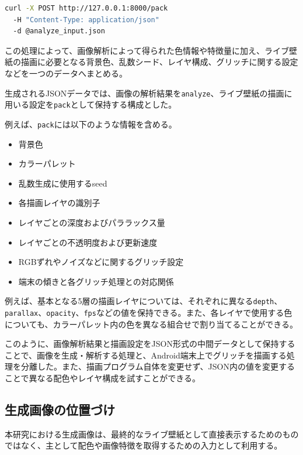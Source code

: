 \noindent\begin{minipage}{\linewidth}
\begin{lstlisting}[language=bash,caption={描画用データ生成のリクエスト例},label={lst:pack-request}]
curl -X POST http://127.0.0.1:8000/pack 
  -H "Content-Type: application/json" 
  -d @analyze_input.json
\end{lstlisting}
\end{minipage}\par

この処理によって、画像解析によって得られた色情報や特徴量に加え、ライブ壁紙の描画に必要となる背景色、乱数シード、レイヤ構成、グリッチに関する設定などを一つのデータへまとめる。

生成されるJSONデータでは、画像の解析結果を\texttt{analyze}、ライブ壁紙の描画に用いる設定を\texttt{pack}として保持する構成とした。

例えば、\texttt{pack}には以下のような情報を含める。

\begin{itemize}
    \item 背景色
    \item カラーパレット
    \item 乱数生成に使用するseed
    \item 各描画レイヤの識別子
    \item レイヤごとの深度およびパララックス量
    \item レイヤごとの不透明度および更新速度
    \item RGBずれやノイズなどに関するグリッチ設定
    \item 端末の傾きと各グリッチ処理との対応関係
\end{itemize}

例えば、基本となる5層の描画レイヤについては、それぞれに異なる\texttt{depth}、\texttt{parallax}、\texttt{opacity}、\texttt{fps}などの値を保持できる。また、各レイヤで使用する色についても、カラーパレット内の色を異なる組合せで割り当てることができる。

このように、画像解析結果と描画設定をJSON形式の中間データとして保持することで、画像を生成・解析する処理と、Android端末上でグリッチを描画する処理を分離した。また、描画プログラム自体を変更せず、JSON内の値を変更することで異なる配色やレイヤ構成を試すことができる。


\subsection{生成画像の位置づけ}

本研究における生成画像は、最終的なライブ壁紙として直接表示するためのものではなく、主として配色や画像特徴を取得するための入力として利用する。

